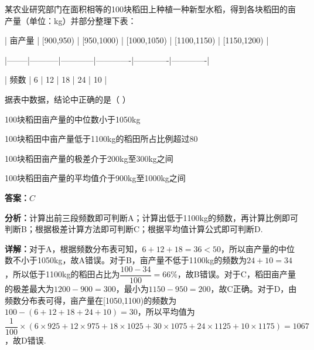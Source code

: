 \begin{question}[points=5]
某农业研究部门在面积相等的100块稻田上种植一种新型水稻，得到各块稻田的亩产量（单位：kg）并部分整理下表：



| 亩产量 | [900,950) | [950,1000) | [1000,1050) | [1100,1150) | [1150,1200) |

|--------|-----------|------------|-------------|-------------|-------------|

| 频数   | 6         | 12         | 18          | 24          | 10          |



据表中数据，结论中正确的是（ ）
\begin{choices}
  \item 100块稻田亩产量的中位数小于1050kg
  \item 100块稻田中亩产量低于1100kg的稻田所占比例超过80%
  \item 100块稻田亩产量的极差介于200kg至300kg之间
  \item 100块稻田亩产量的平均值介于900kg至1000kg之间
\end{choices}
\begin{solution}
\textbf{答案：}$C$

\textbf{分析：}计算出前三段频数即可判断A；计算出低于1100kg的频数，再计算比例即可判断B；根据极差计算方法即可判断C；根据平均值计算公式即可判断D.

\textbf{详解：}对于A，根据频数分布表可知，$6+12+18=36<50$，所以亩产量的中位数不小于1050kg，故A错误。对于B，亩产量不低于1100kg的频数为$24+10=34$，所以低于1100kg的稻田占比为$\dfrac{100-34}{100}=66\%$，故B错误。对于C，稻田亩产量的极差最大为$1200-900=300$，最小为$1150-950=200$，故C正确。对于D，由频数分布表可得，亩产量在[1050,1100)的频数为$100-(6+12+18+24+10)=30$，所以平均值为$\dfrac{1}{100}\times(6\times925+12\times975+18\times1025+30\times1075+24\times1125+10\times1175)=1067$，故D错误.
\end{solution}
\end{question}

